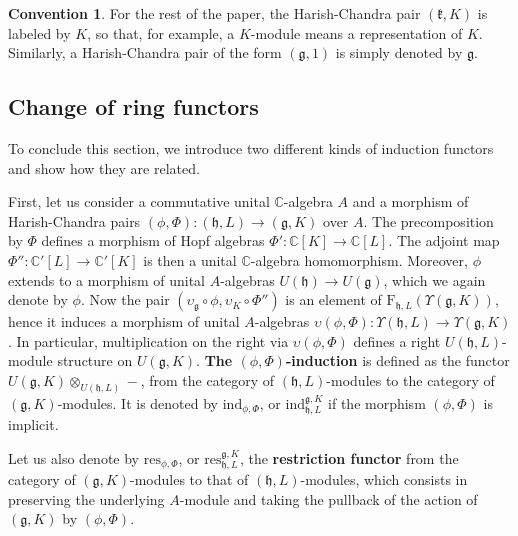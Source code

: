 \documentclass{amsart}
\theoremstyle{definition}
\newtheorem{convention}{Convention}
\begin{document}
\begin{convention}\label{simpler_notation_HC_pairs}
    For the rest of the paper, the Harish-Chandra pair $(\mathfrak{k},K)$ is labeled by $K$, so that, for example, a $K$-module means a representation of $K$. Similarly, a Harish-Chandra pair of the form $(\mathfrak{g},1)$ is simply denoted by $\mathfrak{g}$.
\end{convention}


\subsection{Change of ring functors}\label{changeofring} To conclude this section, we introduce two different kinds of induction functors and show how they are related.

First, let us consider a commutative unital $\mathbb{C}$-algebra $A$ and a morphism of Harish-Chandra pairs $(\phi, \Phi) : (\mathfrak{h},L) \to (\mathfrak{g},K)$ over $A$. The precomposition by $\Phi$ defines a morphism of Hopf algebras $\Phi' : \mathbb{C}[K] \to \mathbb{C}[L]$. The adjoint map $\Phi'' : \mathbb{C}'[L] \to \mathbb{C}'[K]$ is then a unital $\mathbb{C}$-algebra homomorphism. Moreover, $\phi$ extends to a morphism of unital $A$-algebras $U(\mathfrak{h}) \to U(\mathfrak{g})$, which we again denote by $\phi$. Now the pair $(\upsilon_\mathfrak{g} \circ \phi, \upsilon_K \circ \Phi'')$ is an element of $\bm{\mathrm{F}}_{\mathfrak{h},L}(\Upsilon(\mathfrak{g},K))$, hence it induces a morphism of unital $A$-algebras $\upsilon(\phi, \Phi) : \Upsilon(\mathfrak{h},L) \to \Upsilon(\mathfrak{g},K)$. In particular, multiplication on the right via $\upsilon(\phi, \Phi)$ defines a right $U(\mathfrak{h},L)$-module structure on $U(\mathfrak{g},K)$. \textbf{The $(\phi,\Phi)$-induction} is defined as the functor $U(\mathfrak{g},K) \otimes_{U(\mathfrak{h},L)} -$, from the category of $(\mathfrak{h},L)$-modules to the category of $(\mathfrak{g},K)$-modules. It is denoted by $\mathrm{ind}_{\phi,\Phi}$, or $\mathrm{ind}_{\mathfrak{h},L}^{\mathfrak{g},K}$ if the morphism $(\phi,\Phi)$ is implicit.

Let us also denote by $\mathrm{res}_{\phi,\Phi}$, or $\mathrm{res}_{\mathfrak{h},L}^{\mathfrak{g},K}$, the \textbf{restriction functor} from the category of $(\mathfrak{g},K)$-modules to that of $(\mathfrak{h},L)$-modules, which consists in preserving the underlying $A$-module and taking the pullback of the action of $(\mathfrak{g},K)$ by $(\phi,\Phi)$.
\end{document}
